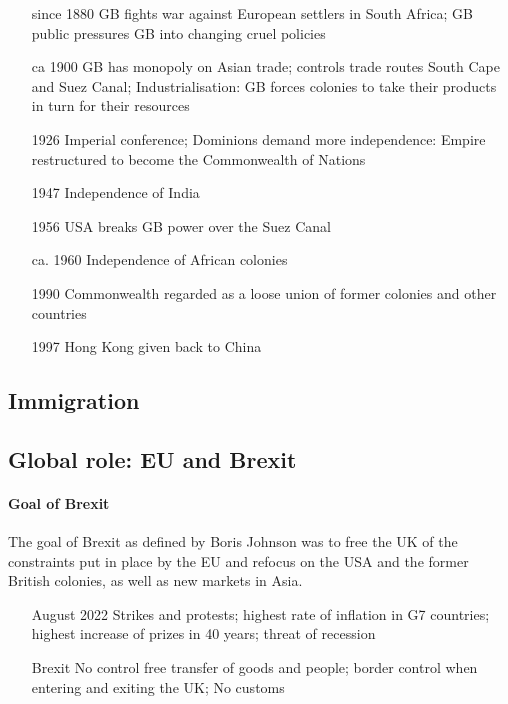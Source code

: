 \documentclass[10pt]{article}
\begin{document}
\begin{itemize}[leftmargin=5pt+]
\item[since 1880] GB fights war against European settlers in South Africa; GB public pressures GB into changing cruel policies
\item[ca 1900] GB has monopoly on Asian trade; controls trade routes South Cape and Suez Canal; Industrialisation: GB forces colonies to take their products in turn for their resources
\item[1926] Imperial conference; Dominions demand more independence: Empire restructured to become the Commonwealth of Nations 
\item[1947] Independence of India
\item[1956] USA breaks GB power over the Suez Canal
\item[ca. 1960] Independence of African colonies
\item[1990] Commonwealth regarded as a loose union of former colonies and other countries
\item[1997] Hong Kong given back to China 
\end{itemize}


	\label{ssec:uk@empire}
\subsection{Immigration}
	\label{ssec:uk@immig}
\subsection{Global role: EU and Brexit}
	\label{ssec:uk@brexit}
	\setcounter{sidenote}{1}
\paragraph{Goal of Brexit}
The goal of Brexit as defined by Boris Johnson was to free the UK of the constraints
put in place by the EU and refocus on the USA and the former British colonies, as well as
new markets in Asia.

\begin{itemize}[leftmargin=5pt+]
\item [August 2022] Strikes and protests; highest rate of inflation in G7 countries;
highest increase of prizes in 40 years; threat of recession 
\item [Brexit] No control free transfer of goods and people; border control when entering and exiting the UK; No customs 
\end{itemize}
\end{document}
